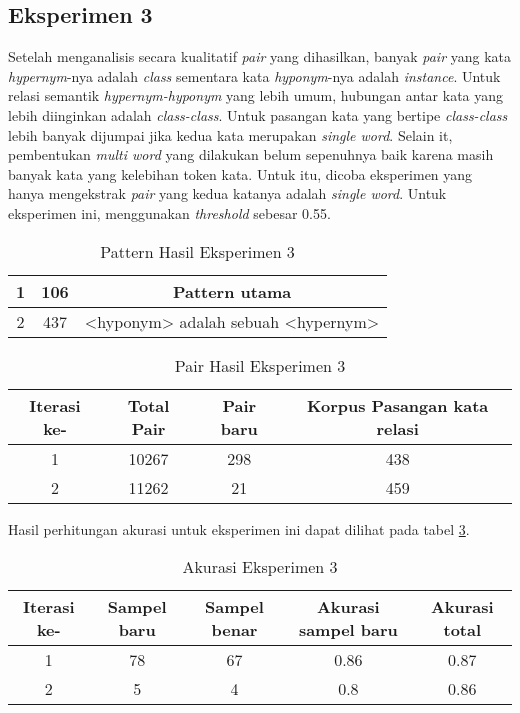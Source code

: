\subsection{Eksperimen 3}
Setelah menganalisis secara kualitatif \textit{pair} yang dihasilkan, banyak \textit{pair} yang kata \textit{hypernym}-nya adalah \textit{class} sementara kata \textit{hyponym}-nya adalah \textit{instance}. Untuk relasi semantik \textit{hypernym-hyponym} yang lebih umum, hubungan antar kata yang lebih diinginkan adalah \textit{class-class}. Untuk pasangan kata yang bertipe \textit{class-class} lebih banyak dijumpai jika kedua kata merupakan \textit{single word}. Selain it, pembentukan \textit{multi word} yang dilakukan belum sepenuhnya baik karena masih banyak kata yang kelebihan token kata. Untuk itu, dicoba eksperimen yang hanya mengekstrak \textit{pair} yang kedua katanya adalah \textit{single word}. Untuk eksperimen ini, menggunakan \textit{threshold} sebesar 0.55.

\begin{table}
  \centering
  \caption{Pattern Hasil Eksperimen 3}
  \label{table:eksp3-pattern}
  \begin{tabular}{|c|c|c|}
  \hline
    1 & 106 & Pattern utama \\ \hline
    2 & 437 & <hyponym> adalah sebuah <hypernym> \\ \hline
  \end{tabular} 
\end{table}

\begin{table}
  \centering
  \caption{Pair Hasil Eksperimen 3}
  \label{table:eksp3-pair}
  \begin{tabular}{|c|c|c|c|}
  \hline
  Iterasi ke-  & Total Pair & Pair baru & Korpus Pasangan kata relasi \\ \hline
  1 & 10267 & 298 & 438 \\ \hline
  2 & 11262 & 21 & 459 \\ \hline
  \end{tabular} 
\end{table}

\noindent Hasil perhitungan akurasi untuk eksperimen ini dapat dilihat pada tabel \ref{table:eksp3-akurasi}.

\begin{table}
  \centering
  \caption{Akurasi Eksperimen 3}
  \label{table:eksp3-akurasi}
  \begin{tabular}{|c|c|c|c|c|}
  \hline
  Iterasi ke- & Sampel baru & Sampel benar & Akurasi sampel baru & Akurasi total \\ \hline
  1 & 78 & 67 & 0.86 & 0.87 \\ \hline
  2 & 5 & 4 & 0.8 & 0.86 \\ \hline
  \end{tabular} 
\end{table}

